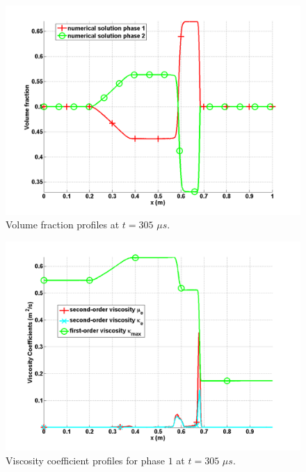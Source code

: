 \begin{figure}[H]
\centering
\includegraphics[width=\textwidth]{figures/SEM/relaxation_two_phases_volume_fraction.png}
\caption{Volume fraction profiles at $t=305$ $\mu s$.}
\label{fig:two-fluids-rel-vf-7-eqn-sect4}
\end{figure}
%
\begin{figure}[H]
\centering
\includegraphics[width=\textwidth]{figures/SEM/relaxation_two_phases_liquid_viscosity_kappa_mu.png}
\caption{Viscosity coefficient profiles for phase $1$ at $t=305$ $\mu s$.}
\label{fig:two-fluids-rel-visc-2-7-eqn-sect4}
\end{figure}
%
